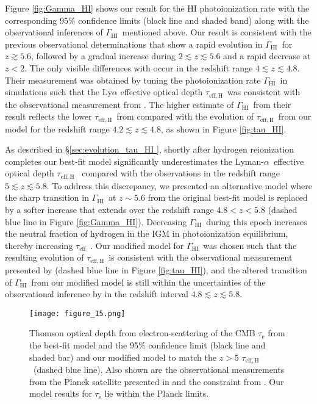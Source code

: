 \documentclass[twocolumn]{aastex62}
\newcommand\Lya{Lyman-$\alpha$}
\newcommand\taueff{$\tau_{\mathrm{eff}}$~}
\newcommand\GammaHI{$\Gamma_{\mathrm{HI}}$~}
\newcommand\taueffH{$\tau_{\mathrm{eff,H}}$~}
\begin{document}
Figure \ref{fig:Gamma_HI} shows our result for the HI photoionization rate
with the corresponding 95\% confidence limits (black line and shaded band) along with the 
observational inferences of \GammaHI mentioned above.
Our result is consistent with the previous observational determinations
that show a rapid evolution in \GammaHI for $z \gtrsim 5.6$, followed by 
a gradual increase during $2 \lesssim z \lesssim 5.6$ and a rapid decrease at $z< 2$.
The only visible differences with \cite{Becker+2013b} occur in the 
redshift range $4 \lesssim z \lesssim 4.8$.
Their measurement was obtained by tuning the photoionization rate \GammaHI in simulations such that the Ly$\alpha$
effective optical 
depth \taueffH was consistent with the observational measurement from \cite{Becker+2013a}.
The higher estimate of \GammaHI from their result 
reflects the lower \taueffH from \cite{Becker+2013a} compared with the evolution of
\taueffH from our model for the redshift range $4.2 \lesssim z \lesssim 4.8$,
as shown in Figure \ref{fig:tau_HI}.

As described in \S \ref{sec:evolution_tau_HI }, shortly after hydrogen reionization 
completes 
our best-fit model
significantly underestimates
the \Lya\ effective optical depth \taueffH
compared with the observations in the redshift range $5 \lesssim z \lesssim 5.8$.
To address this discrepancy, we presented an alternative model where 
the sharp transition in \GammaHI at $z\sim 5.6$ from the original best-fit model
is replaced by a softer increase that extends over the redshift range $ 4.8 < z < 5.8$ (dashed 
blue line in Figure \ref{fig:Gamma_HI}). 
Decreasing \GammaHI during this epoch increases the neutral fraction of hydrogen in the IGM in photoionization equilibrium, thereby  increasing \taueff.
Our modified model for \GammaHI was chosen such that the resulting evolution of \taueffH is consistent with the observational measurement presented by 
\cite{Bosman_2018}(dashed blue line in Figure \ref{fig:tau_HI}), and the altered transition of \GammaHI from our modified model is still within the uncertainties of the observational inference 
by \cite{daloisio2018a} in the redshift interval $ 4.8 \lesssim z \lesssim 5.8$.



\begin{figure}
\texttt{[image: figure\_15.png]}
\caption{Thomson optical depth from electron-scattering of the CMB $\tau_\mathrm{e}$
from the best-fit model and the 95\% confidence limit (black line and shaded bar) and our 
modified model to match the $z>5$ \taueffH (dashed blue line).
Also shown are the observational measurements from the Planck satellite presented in
\cite{Planck_collaboration_2020} 
and the constraint from \cite{deBelsunce+2021}.
Our model results for $\tau_\mathrm{e}$ lie within the Planck limits.}
\label{fig:tau_electron}
\end{figure}
\end{document}
